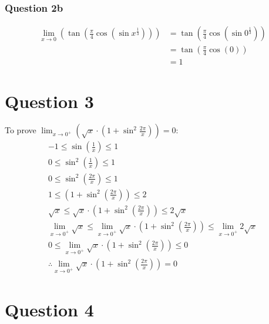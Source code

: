 \documentclass{article}
\begin{document}
\subsubsection*{Question 2b}
\begin{align*}
    \lim_{x\to 0}(\tan(\frac{\pi}{4}\cos(\sin x^\frac{1}{3}))) & = \tan(\frac{\pi}{4}\cos(\sin 0^\frac{1}{3})) \\
                                                               & = \tan(\frac{\pi}{4}\cos(0))                  \\
                                                               & = 1
\end{align*}

\section*{Question 3}
To prove $\lim_{x\to 0^+}(\sqrt{x}\cdot (1 + \sin^2\frac{2\pi}{x}))=0$:
\begin{align*}
    -1 \leq \sin(\frac{1}{x}) \leq 1                                                                                  \\
    0 \leq \sin^2(\frac{1}{x}) \leq 1                                                                                 \\
    0 \leq \sin^2(\frac{2\pi}{x}) \leq 1                                                                              \\
    1 \leq (1+\sin^2(\frac{2\pi}{x})) \leq 2                                                                          \\
    \sqrt{x} \leq \sqrt{x}\cdot(1+\sin^2(\frac{2\pi}{x})) \leq 2\sqrt{x}                                              \\
    \lim_{x\to 0^+}\sqrt{x} \leq \lim_{x\to 0^+}\sqrt{x}\cdot(1+\sin^2(\frac{2\pi}{x})) \leq \lim_{x\to 0^+}2\sqrt{x} \\
    0 \leq \lim_{x\to 0^+}\sqrt{x}\cdot(1+\sin^2(\frac{2\pi}{x})) \leq 0                                              \\
    \therefore \lim_{x\to 0^+}\sqrt{x}\cdot(1+\sin^2(\frac{2\pi}{x})) = 0
\end{align*}

\section*{Question 4}
\end{document}

